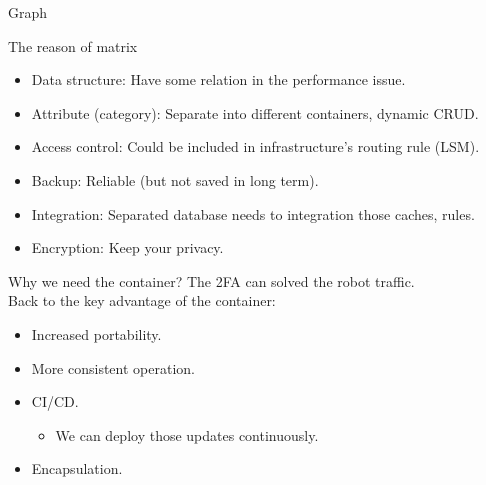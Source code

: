 \documentclass{beamer}
\begin{document}
\begin{CJK*}{UTF8}{bsmi}
\begin{frame}{Graph}
  \end{frame}

  \begin{frame}{The reason of matrix}
    \begin{itemize}
      \item Data structure: Have some relation in the performance issue.
      \item Attribute (category): Separate into different containers, dynamic CRUD.
      \item Access control: Could be included in infrastructure's routing rule (LSM).
      \item Backup: Reliable (but not saved in long term).
      \item Integration: Separated database needs to integration those caches, rules.
      \item Encryption: Keep your privacy.
    \end{itemize}
  \end{frame}

  \begin{frame}{Why we need the container?}
    The 2FA can solved the robot traffic.\\
    Back to the key advantage of the container:\\
    \begin{itemize}
      \item Increased portability.
      \item More consistent operation.
      \item CI/CD.
            \begin{itemize}
              \item We can deploy those updates continuously.
            \end{itemize}
      \item Encapsulation.
    \end{itemize}
  \end{frame}


\end{CJK*}
\end{document}
